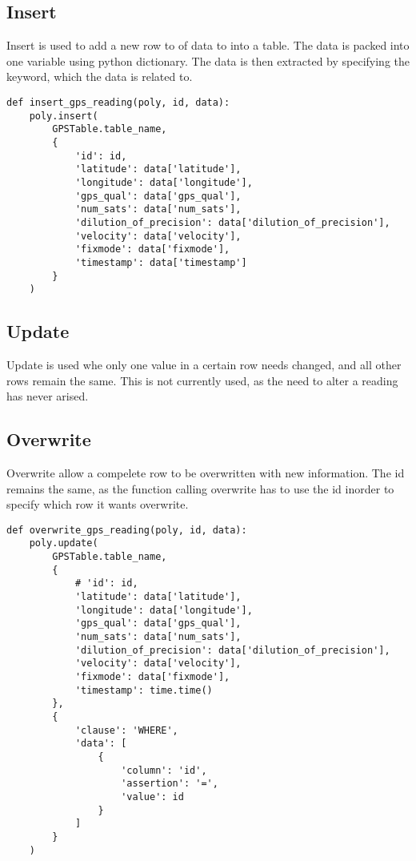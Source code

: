 \subsection{Insert}
Insert is used to add a new row to of data to into a table. The data is packed into one variable using python dictionary. The data is then extracted by specifying the keyword, which the data is related to.  

\begin{lstlisting}[style=custompython]
def insert_gps_reading(poly, id, data):
    poly.insert(
        GPSTable.table_name,
        {
            'id': id,
            'latitude': data['latitude'],
            'longitude': data['longitude'],
            'gps_qual': data['gps_qual'],
            'num_sats': data['num_sats'],
            'dilution_of_precision': data['dilution_of_precision'],
            'velocity': data['velocity'],
            'fixmode': data['fixmode'],
            'timestamp': data['timestamp']
        }
    )
\end{lstlisting}
\subsection{Update}
Update is used whe only one value in a certain row needs changed, and all other rows remain the same. This is not currently used, as the need to alter a reading has never arised. 

\subsection{Overwrite}
Overwrite allow a compelete row to be overwritten with new information. The id remains the same, as the function calling overwrite has to use the id inorder to specify which row it wants overwrite.
\begin{lstlisting}[style=custompython]
def overwrite_gps_reading(poly, id, data):
    poly.update(
        GPSTable.table_name,
        {
            # 'id': id,
            'latitude': data['latitude'],
            'longitude': data['longitude'],
            'gps_qual': data['gps_qual'],
            'num_sats': data['num_sats'],
            'dilution_of_precision': data['dilution_of_precision'],
            'velocity': data['velocity'],
            'fixmode': data['fixmode'],
            'timestamp': time.time()
        },
        {
            'clause': 'WHERE',
            'data': [
                {
                    'column': 'id',
                    'assertion': '=',
                    'value': id
                }
            ]
        }
    )
\end{lstlisting}

